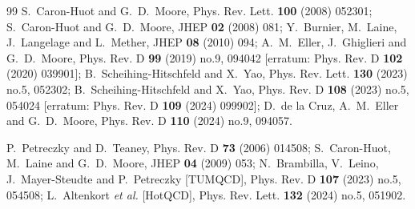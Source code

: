 \documentclass[final,3p,times]{elsarticle}
\begin{document}
\begin{thebibliography}{99}
S.~Caron-Huot and G.~D.~Moore,
Phys. Rev. Lett. \textbf{100} (2008) 052301;
S.~Caron-Huot and G.~D.~Moore,
JHEP \textbf{02} (2008) 081;
Y.~Burnier, M.~Laine, J.~Langelage and L.~Mether,
JHEP \textbf{08} (2010) 094;
A.~M.~Eller, J.~Ghiglieri and G.~D.~Moore,
Phys. Rev. D \textbf{99} (2019) no.9, 094042
[erratum: Phys. Rev. D \textbf{102} (2020) 039901];
B.~Scheihing-Hitschfeld and X.~Yao,
Phys. Rev. Lett. \textbf{130} (2023) no.5, 052302;
B.~Scheihing-Hitschfeld and X.~Yao,
Phys. Rev. D \textbf{108} (2023) no.5, 054024
[erratum: Phys. Rev. D \textbf{109} (2024) 099902];
D.~de la Cruz, A.~M.~Eller and G.~D.~Moore,
Phys. Rev. D \textbf{110} (2024) no.9, 094057.





P.~Petreczky and D.~Teaney,
Phys. Rev. D \textbf{73} (2006) 014508;
S.~Caron-Huot, M.~Laine and G.~D.~Moore,
JHEP \textbf{04} (2009) 053;
N.~Brambilla, V.~Leino, J.~Mayer-Steudte and P.~Petreczky [TUMQCD],
Phys. Rev. D \textbf{107} (2023) no.5, 054508;
L.~Altenkort \textit{et al.} [HotQCD],
Phys. Rev. Lett. \textbf{132} (2024) no.5, 051902.


\end{thebibliography}
\end{document}
